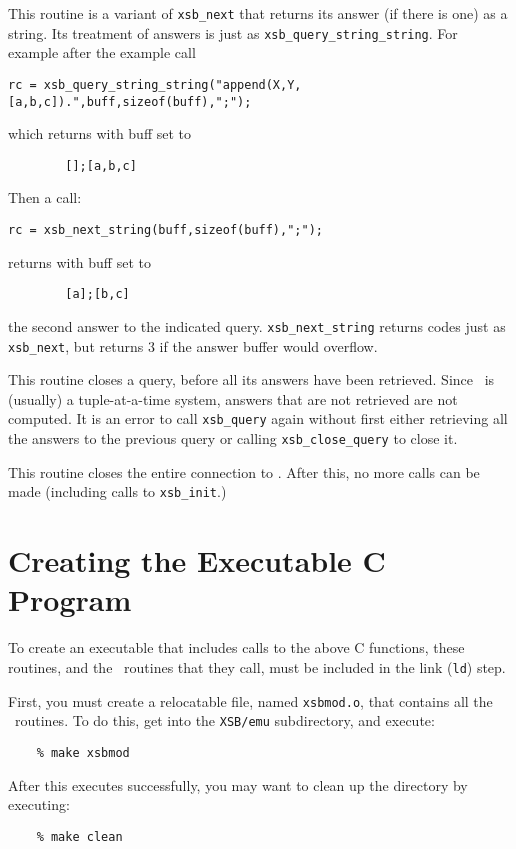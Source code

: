 {\begin{description}
   This routine is a variant of {\tt xsb\_next} that
returns its answer (if there is one) as a string.  Its treatment of
answers is just as {\tt xsb\_query\_string\_string}.  For example after
the example call 
\begin{verbatim}
rc = xsb_query_string_string("append(X,Y,[a,b,c]).",buff,sizeof(buff),";");
\end{verbatim}
which returns with buff set to 
\begin{verbatim}
        [];[a,b,c]
\end{verbatim}
Then a call:
\begin{verbatim}
rc = xsb_next_string(buff,sizeof(buff),";");
\end{verbatim}
returns with buff set to 
\begin{verbatim}
        [a];[b,c]
\end{verbatim}
the second answer to the indicated query. {\tt xsb\_next\_string}
returns codes just as {\tt xsb\_next}, but returns 3 if the answer
buffer would overflow.

 
This routine closes a query, before all its answers have been
retrieved.  Since \ourprolog\ is (usually) a tuple-at-a-time system,
answers that are not retrieved are not computed.
It is an error to call {\tt xsb\_query} again without
first either retrieving all the answers to the previous query or
calling {\tt xsb\_close\_query} to close it.

 
This routine closes the entire connection to \ourprolog .  After this,
no more calls can be made (including calls to {\tt xsb\_init}.)

\end{description}

\section{Creating the Executable C Program}

To create an executable that includes calls to the above C functions,
these routines, and the \ourprolog\ routines that they call, must be
included in the link ({\tt ld}) step.

First, you must create a relocatable file, named {\tt xsbmod.o}, that
contains all the \ourprolog\ routines.  To do this, get into the
{\tt XSB/emu} subdirectory, and execute:
\begin{verbatim}
    % make xsbmod
\end{verbatim}
After this executes successfully, you may want to clean up the directory
by executing:
\begin{verbatim}
    % make clean
\end{verbatim}

}

